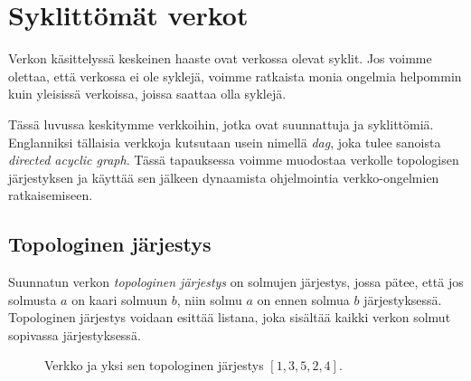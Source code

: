 \chapter{Syklittömät verkot}

Verkon käsittelyssä keskeinen haaste ovat verkossa olevat syklit.
Jos voimme olettaa, että verkossa ei ole syklejä,
voimme ratkaista monia ongelmia helpommin kuin yleisissä verkoissa,
joissa saattaa olla syklejä.

Tässä luvussa keskitymme verkkoihin, jotka ovat suunnattuja
ja syklit\-tömiä.
Englanniksi tällaisia verkkoja kutsutaan usein nimellä \emph{dag},
joka tulee sanoista \emph{directed acyclic graph}.
Tässä tapauksessa voimme muodostaa verkolle topologisen
järjestyksen ja käyttää sen jälkeen dynaamista ohjelmointia
verkko-ongelmien ratkaisemiseen.

\section{Topologinen järjestys}

Suunnatun verkon \emph{topologinen järjestys} on solmujen järjestys,
jossa pätee, että jos solmusta $a$ on kaari solmuun $b$,
niin solmu $a$ on ennen solmua $b$ järjestyksessä.
Topologinen järjestys voidaan esittää listana,
joka sisältää kaikki verkon solmut sopivassa järjestyksessä.

\begin{figure}
\center
\begin{center}
\end{center}
\caption{Verkko ja yksi sen topologinen järjestys $[1,3,5,2,4]$.}
\label{fig:topjar}
\end{figure}

